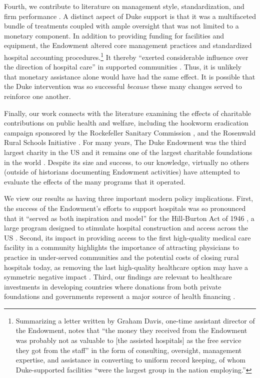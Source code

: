 \documentclass[12pt]{article}
\begin{document}
Fourth, we contribute to literature on management style, standardization, and firm performance . 
A distinct aspect of Duke support is that it was a multifaceted bundle of treatments coupled with ample oversight that was not limited to a monetary component. 
In addition to providing funding for facilities and equipment, the Endowment altered core management practices and standardized hospital accounting procedures.\footnote{Summarizing a letter written by Graham Davis, one-time assistant director of the Endowment,  notes that ``the money they received from the Endowment was probably not as valuable to [the assisted hospitals] as the free service they got from the staff'' in the form of consulting, oversight, management expertise, and assistance in converting to uniform record keeping, of whom Duke-supported facilities ``were the largest group in the nation employing.''}
It thereby ``exerted considerable influence over the direction of hospital care'' in supported communities .
Thus, it is unlikely that monetary assistance alone would have had the same effect. It is possible that the Duke intervention was so successful \emph{because} these many changes served to reinforce one another.

Finally, our work connects with the literature examining the effects of charitable contributions on public health and welfare, including the hookworm eradication campaign sponsored by the Rockefeller Sanitary Commission , and the Rosenwald Rural Schools Initiative .  
For many years, The Duke Endowment was the third largest charity in the US and it remains one of the largest charitable foundations in the world . 
Despite its size and success, to our knowledge, virtually no others (outside of historians documenting Endowment activities) have attempted to evaluate the effects of the many programs that it operated. 


We view our results as having three important modern policy implications.
First, the success of the Endowment’s efforts to support hospitals was so pronounced that it  ``served as both inspiration and model'' for the Hill-Burton Act of 1946 , a large program designed to stimulate hospital construction and access across the US . 
Second, its impact in providing access to the first high-quality medical care facility in a community highlights the importance of attracting physicians to practice in under-served communities and the potential costs of closing rural hospitals today, as removing the last high-quality healthcare option may have a symmetric negative impact .  
Third, our findings are relevant to healthcare investments in developing countries where donations from both private foundations and governments represent a major source of health financing . 
\end{document}
